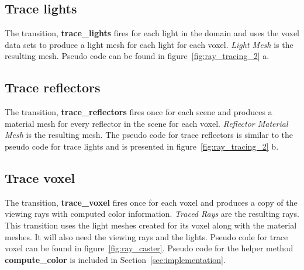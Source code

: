 \subsection{Trace lights}
The transition, \textbf{trace\_lights} fires for each light in the domain and
uses the voxel data sets to produce a light mesh for each light for each
voxel.  \emph{Light Mesh} is the resulting mesh.  Pseudo code can be found in 
figure~\ref{fig:ray_tracing_2} a.

\subsection{Trace reflectors}
The transition, \textbf{trace\_reflectors} fires once for each scene and 
produces a material mesh for every reflector in the scene for each voxel.  
\emph{Reflector Material Mesh} is the resulting mesh.  The pseudo code for trace 
reflectors is similar to the pseudo code for trace lights and is presented in
 figure~\ref{fig:ray_tracing_2} b.

\subsection{Trace voxel}
The transition, \textbf{trace\_voxel} fires once for each voxel and produces a 
copy of the viewing rays with computed color information.  \emph{Traced Rays} 
are the resulting rays.  This transition uses the light meshes created for 
its voxel along with the material meshes.  It will also need the viewing 
rays and the lights.  Pseudo code for trace voxel can be found in 
figure~\ref{fig:ray_caster}.  Pseudo code for the helper method 
\textbf{compute\_color} is included in Section~\ref{sec:implementation}.


